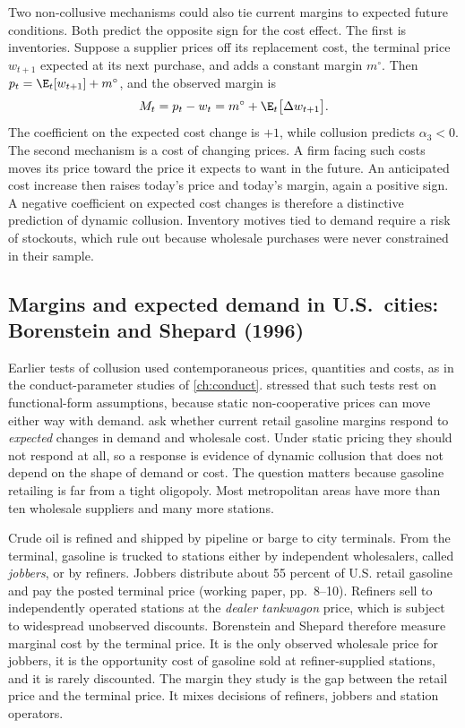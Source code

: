 Two non-collusive mechanisms could also tie current margins to expected future conditions. Both predict
the opposite sign for the cost effect. The first is inventories. Suppose a supplier prices off its
replacement cost, the terminal price $w_{t+1}$ expected at its next purchase, and adds a constant margin
$m^{\circ}$. Then $p_t=\E_t[w_{t+1}]+m^{\circ}$, and the observed margin is
\begin{equation}\label{eq:13-gas-inventory}
M_t=p_t-w_t=m^{\circ}+\E_t\big[\Delta w_{t+1}\big].
\end{equation}
The coefficient on the expected cost change is $+1$, while collusion predicts $\alpha_3<0$. The second
mechanism is a cost of changing prices. A firm facing such costs moves its price toward the price it expects
to want in the future. An anticipated cost increase then raises today's price and today's margin, again a
positive sign. A negative coefficient on expected cost changes is therefore a distinctive prediction of
dynamic collusion. Inventory motives tied to demand require a risk of stockouts, which
\citet{BorensteinShepard1996} rule out because wholesale purchases were never constrained in their sample.

\subsection{Margins and expected demand in U.S.\ cities: Borenstein and Shepard (1996)}\label{sec:13-bs}

Earlier tests of collusion used contemporaneous prices, quantities and costs, as in the conduct-parameter
studies of \cref{ch:conduct}. \citet{Bresnahan1989} stressed that such tests rest on functional-form
assumptions, because static non-cooperative prices can move either way with demand. \citet{BorensteinShepard1996}
ask whether current retail gasoline margins respond to \emph{expected} changes in demand and wholesale cost.
Under static pricing they should not respond at all, so a response is evidence of dynamic collusion that
does not depend on the shape of demand or cost. The question matters because gasoline retailing is far from
a tight oligopoly. Most metropolitan areas have more than ten wholesale suppliers and many more stations.

Crude oil is refined and shipped by pipeline or barge to city terminals. From the terminal, gasoline is
trucked to stations either by independent wholesalers, called \emph{jobbers}, or by refiners. Jobbers
distribute about 55 percent of U.S. retail gasoline and pay the posted terminal price
(working paper, pp.~8--10). Refiners sell to independently operated stations at the \emph{dealer tankwagon}
price, which is subject to widespread unobserved discounts. Borenstein and Shepard therefore measure
marginal cost by the terminal price. It is the only observed wholesale price for jobbers, it is the
opportunity cost of gasoline sold at refiner-supplied stations, and it is rarely discounted. The margin they
study is the gap between the retail price and the terminal price. It mixes decisions of refiners, jobbers and
station operators.

